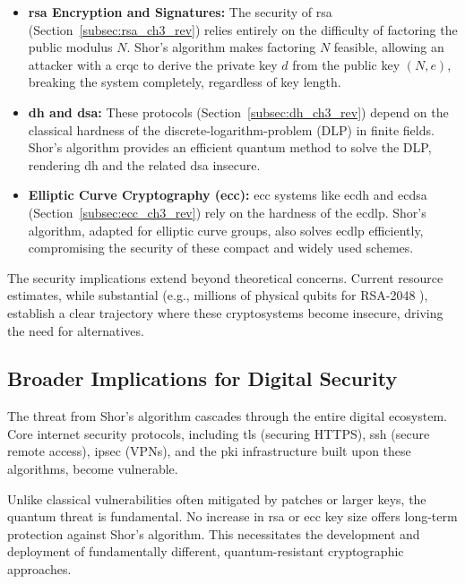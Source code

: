 \begin{itemize} %
    \item \textbf{\gls{rsa} Encryption and Signatures:} The security of \gls{rsa} (Section~\ref{subsec:rsa_ch3_rev}) relies entirely on the difficulty of factoring the public modulus $N$. Shor's algorithm makes factoring $N$ feasible, allowing an attacker with a \gls{crqc} to derive the private key $d$ from the public key $(N,e)$, breaking the system completely, regardless of key length.
    \item \textbf{\gls{dh} and \gls{dsa}:} These protocols (Section~\ref{subsec:dh_ch3_rev}) depend on the classical hardness of the \gls{discrete-logarithm-problem} (DLP) in finite fields. Shor's algorithm provides an efficient quantum method to solve the DLP, rendering \gls{dh} and the related \gls{dsa} insecure.
    \item \textbf{Elliptic Curve Cryptography (\gls{ecc}):} \Gls{ecc} systems like \gls{ecdh} and \gls{ecdsa} (Section~\ref{subsec:ecc_ch3_rev}) rely on the hardness of the \gls{ecdlp}. Shor's algorithm, adapted for elliptic curve groups, also solves \gls{ecdlp} efficiently, compromising the security of these compact and widely used schemes.
\end{itemize}
\medskip %

The security implications extend beyond theoretical concerns. Current resource estimates, while substantial (e.g., millions of physical qubits for RSA-2048 \parencite{gidney2021factor}), establish a clear trajectory where these cryptosystems become insecure, driving the need for alternatives.

\subsection{Broader Implications for Digital Security}

The threat from Shor's algorithm cascades through the entire digital ecosystem. Core internet security protocols, including \gls{tls} (securing HTTPS), \gls{ssh} (secure remote access), \gls{ipsec} (VPNs), and the \gls{pki} infrastructure built upon these algorithms, become vulnerable.

Unlike classical vulnerabilities often mitigated by patches or larger keys, the quantum threat is fundamental. No increase in \gls{rsa} or \gls{ecc} key size offers long-term protection against Shor's algorithm. This necessitates the development and deployment of fundamentally different, quantum-resistant cryptographic approaches.


